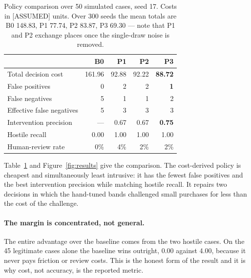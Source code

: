 \documentclass{article}
\begin{document}
\begin{table}[t]
\centering
\small
\begin{tabular}{lrrrr}
\toprule
& \textbf{B0} & \textbf{P1} & \textbf{P2} & \textbf{P3} \\
\midrule
Total decision cost      & 161.96 & 92.88 & 92.22 & \textbf{88.72} \\
False positives          & 0 & 2 & 2 & \textbf{1} \\
False negatives          & 5 & 1 & 1 & 2 \\
Effective false negatives& 5 & 3 & 3 & 3 \\
Intervention precision   & --- & 0.67 & 0.67 & \textbf{0.75} \\
Hostile recall           & 0.00 & 1.00 & 1.00 & 1.00 \\
Human-review rate        & 0\% & 4\% & 2\% & 2\% \\
\bottomrule
\end{tabular}
\caption{Policy comparison over 50 simulated cases, seed 17. Costs in [ASSUMED] units. Over 300 seeds the mean totals are B0 148.83, P1 77.74, P2 83.87, P3 69.30 --- note that P1 and P2 exchange places once the single-draw noise is removed.}
\label{tab:results}
\end{table}

Table~\ref{tab:results} and Figure~\ref{fig:results} give the comparison. The cost-derived
policy is cheapest and simultaneously least intrusive: it has the fewest false positives
and the best intervention precision while matching hostile recall. It repairs two decisions
in which the hand-tuned bands challenged small purchases for less than the cost of the
challenge.

\paragraph{The margin is concentrated, not general.} The entire advantage over the baseline
comes from the two hostile cases. On the 45 legitimate cases alone the baseline wins
outright, 0.00 against 4.00, because it never pays friction or review costs. This is the
honest form of the result and it is why cost, not accuracy, is the reported metric.
\end{document}
